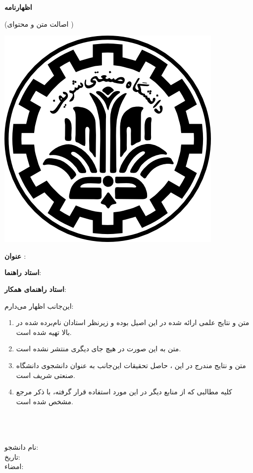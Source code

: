 
{\parindent0pt

\begin{center}
{\large\bf اظهارنامه}

{\small(اصالت متن و محتوای \ThesisType{} \ThesisDegree)}
\end{center}
\vspace{-6em}
\includegraphics[scale=0.15]{front/template/images/logo.png}
\vspace{1em}

\textbf{عنوان ‌\ThesisType}: \ThesisTitle

\vspace{.1em}
\begin{multicols}{2}
	{\textbf{استاد راهنما}: \ThesisSupervisor}
	
	{\textbf{استاد راهنمای همکار}: \ThesisCoSupervisor}
\end{multicols}

\vspace{0.2em}
\small
این‌جانب {\ThesisAuthor} اظهار می‌دارم:
\small
\begin{enumerate}
\item متن و نتایج علمی ارائه شده در این \ThesisType{} اصیل بوده و زیرنظر استادان نام‌برده ‌شده در بالا تهیه شده است.
\item متن \ThesisType{} به این صورت در هیچ جای دیگری منتشر نشده است.
\item متن و نتایج مندرج در این \ThesisType، حاصل تحقیقات این‌جانب به عنوان دانشجوی \ThesisDegree{} دانشگاه صنعتی شریف است.
\item کلیه مطالبی که از منابع دیگر در این \ThesisType{} مورد استفاده قرار گرفته، با ذکر مرجع مشخص شده است.
\end{enumerate}
\begin{multicols}{3}
\ \\
\ \\
\ \\
نام دانشجو: \ThesisAuthor\\
تاریخ: \\
امضاء: \\


\end{multicols}}
